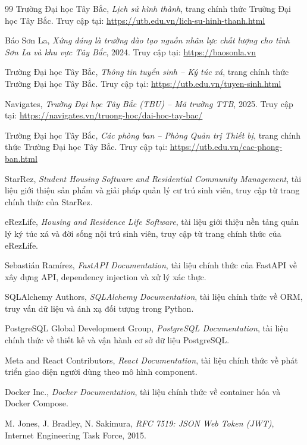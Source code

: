 \documentclass[12pt]{article}
\begin{document}
\begin{thebibliography}{99}
    Trường Đại học Tây Bắc, \textit{Lịch sử hình thành}, trang chính thức Trường Đại học Tây Bắc. Truy cập tại: \url{https://utb.edu.vn/lich-su-hinh-thanh.html}
    
    Báo Sơn La, \textit{Xứng đáng là trường đào tạo nguồn nhân lực chất lượng cho tỉnh Sơn La và khu vực Tây Bắc}, 2024. Truy cập tại: \url{https://baosonla.vn}
    
    Trường Đại học Tây Bắc, \textit{Thông tin tuyển sinh -- Ký túc xá}, trang chính thức Trường Đại học Tây Bắc. Truy cập tại: \url{https://utb.edu.vn/tuyen-sinh.html}
    
    Navigates, \textit{Trường Đại học Tây Bắc (TBU) -- Mã trường TTB}, 2025. Truy cập tại: \url{https://navigates.vn/truong-hoc/dai-hoc-tay-bac/}
    
    Trường Đại học Tây Bắc, \textit{Các phòng ban -- Phòng Quản trị Thiết bị}, trang chính thức Trường Đại học Tây Bắc. Truy cập tại: \url{https://utb.edu.vn/cac-phong-ban.html}
    
	StarRez, \textit{Student Housing Software and Residential Community Management}, tài liệu giới thiệu sản phẩm và giải pháp quản lý cư trú sinh viên, truy cập từ trang chính thức của StarRez.
	
	eRezLife, \textit{Housing and Residence Life Software}, tài liệu giới thiệu nền tảng quản lý ký túc xá và đời sống nội trú sinh viên, truy cập từ trang chính thức của eRezLife.
	
	Sebastián Ramírez, \textit{FastAPI Documentation}, tài liệu chính thức của FastAPI về xây dựng API, dependency injection và xử lý xác thực.
	
	SQLAlchemy Authors, \textit{SQLAlchemy Documentation}, tài liệu chính thức về ORM, truy vấn dữ liệu và ánh xạ đối tượng trong Python.
	
	PostgreSQL Global Development Group, \textit{PostgreSQL Documentation}, tài liệu chính thức về thiết kế và vận hành cơ sở dữ liệu PostgreSQL.
	
	Meta and React Contributors, \textit{React Documentation}, tài liệu chính thức về phát triển giao diện người dùng theo mô hình component.
	
	Docker Inc., \textit{Docker Documentation}, tài liệu chính thức về container hóa và Docker Compose.
	
	M. Jones, J. Bradley, N. Sakimura, \textit{RFC 7519: JSON Web Token (JWT)}, Internet Engineering Task Force, 2015.
\end{thebibliography}
\end{document}
